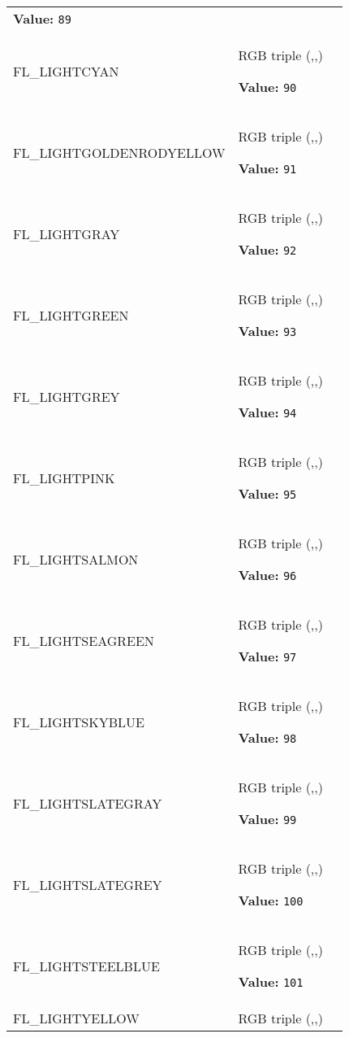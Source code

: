 \begin{longtable}{|p{\varnamewidth}|p{\vardescrwidth}|l}
\textbf{Value:} 
{\tt 89}&\\
\cline{1-2}
\raggedright F\-L\-\_\-L\-I\-G\-H\-T\-C\-Y\-A\-N\- & \raggedright RGB triple (,,)

\textbf{Value:} 
{\tt 90}&\\
\cline{1-2}
\raggedright F\-L\-\_\-L\-I\-G\-H\-T\-G\-O\-L\-D\-E\-N\-R\-O\-D\-Y\-E\-L\-L\-O\-W\- & \raggedright RGB triple (,,)

\textbf{Value:} 
{\tt 91}&\\
\cline{1-2}
\raggedright F\-L\-\_\-L\-I\-G\-H\-T\-G\-R\-A\-Y\- & \raggedright RGB triple (,,)

\textbf{Value:} 
{\tt 92}&\\
\cline{1-2}
\raggedright F\-L\-\_\-L\-I\-G\-H\-T\-G\-R\-E\-E\-N\- & \raggedright RGB triple (,,)

\textbf{Value:} 
{\tt 93}&\\
\cline{1-2}
\raggedright F\-L\-\_\-L\-I\-G\-H\-T\-G\-R\-E\-Y\- & \raggedright RGB triple (,,)

\textbf{Value:} 
{\tt 94}&\\
\cline{1-2}
\raggedright F\-L\-\_\-L\-I\-G\-H\-T\-P\-I\-N\-K\- & \raggedright RGB triple (,,)

\textbf{Value:} 
{\tt 95}&\\
\cline{1-2}
\raggedright F\-L\-\_\-L\-I\-G\-H\-T\-S\-A\-L\-M\-O\-N\- & \raggedright RGB triple (,,)

\textbf{Value:} 
{\tt 96}&\\
\cline{1-2}
\raggedright F\-L\-\_\-L\-I\-G\-H\-T\-S\-E\-A\-G\-R\-E\-E\-N\- & \raggedright RGB triple (,,)

\textbf{Value:} 
{\tt 97}&\\
\cline{1-2}
\raggedright F\-L\-\_\-L\-I\-G\-H\-T\-S\-K\-Y\-B\-L\-U\-E\- & \raggedright RGB triple (,,)

\textbf{Value:} 
{\tt 98}&\\
\cline{1-2}
\raggedright F\-L\-\_\-L\-I\-G\-H\-T\-S\-L\-A\-T\-E\-G\-R\-A\-Y\- & \raggedright RGB triple (,,)

\textbf{Value:} 
{\tt 99}&\\
\cline{1-2}
\raggedright F\-L\-\_\-L\-I\-G\-H\-T\-S\-L\-A\-T\-E\-G\-R\-E\-Y\- & \raggedright RGB triple (,,)

\textbf{Value:} 
{\tt 100}&\\
\cline{1-2}
\raggedright F\-L\-\_\-L\-I\-G\-H\-T\-S\-T\-E\-E\-L\-B\-L\-U\-E\- & \raggedright RGB triple (,,)

\textbf{Value:} 
{\tt 101}&\\
\cline{1-2}
\raggedright F\-L\-\_\-L\-I\-G\-H\-T\-Y\-E\-L\-L\-O\-W\- & \raggedright RGB triple (,,)


\end{longtable}
